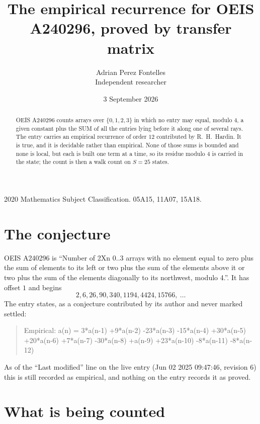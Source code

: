 \documentclass[11pt,a4paper]{article}
\title{The empirical recurrence for OEIS A240296, proved by transfer matrix}
\author{Adrian Perez Fontelles\\ \small Independent researcher}
\date{3 September 2026}
\theoremstyle{plain}
\theoremstyle{definition}
\begin{document}
\maketitle

\begin{abstract}
OEIS A240296 counts arrays over $\{0,1,2,3\}$ in which no entry may equal, modulo $4$, a given
constant plus the SUM of all the entries lying before it along one of several rays. The entry
carries an empirical recurrence of order $12$ contributed by R.~H.~Hardin. It is true, and
it is decidable rather than empirical. None of those sums is bounded and none is local, but
each is built one term at a time, so its residue modulo $4$ is carried in the state; the
count is then a walk count on $S=25$ states.
\end{abstract}

\noindent\small 2020 Mathematics Subject Classification. 05A15, 11A07, 15A18.\normalsize

\section{The conjecture}

OEIS A240296 is ``Number of 2Xn 0..3 arrays with no element equal to zero plus the sum of elements to its left or two plus the sum of the elements above it or two plus the sum of the elements diagonally to its northwest, modulo 4.''. It has offset $1$ and begins
\[
2, 6, 26, 90, 340, 1194, 4424, 15766,\ \dots
\]
The entry states, as a conjecture contributed by its author and never marked settled:
\begin{quote}
Empirical: a(n) = 3*a(n-1) +9*a(n-2) -23*a(n-3) -15*a(n-4) +30*a(n-5) +20*a(n-6) +7*a(n-7) -30*a(n-8) +a(n-9) +23*a(n-10) -8*a(n-11) -8*a(n-12)
\end{quote}
As of the ``Last modified'' line on the live entry (Jun 02 2025 09:47:46, revision 6) this is still
recorded as empirical, and nothing on the entry records it as proved.

\section{What is being counted}
\end{document}
